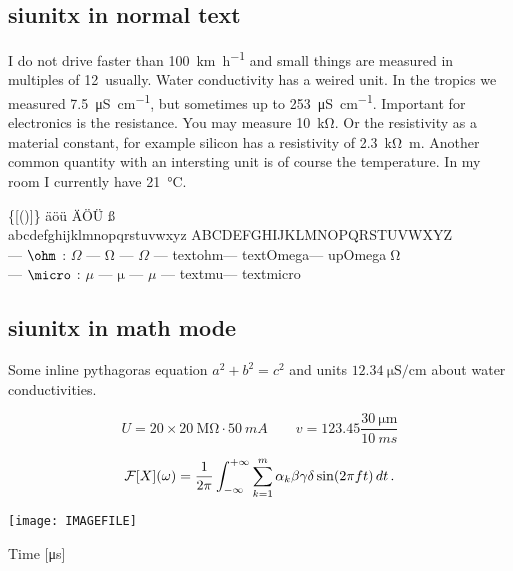 \subsection{siunitx in normal text}

I do not drive faster than \SI{100}{\kilo\meter\per\hour} and small
things are measured in multiples of 12\,\micro\meter{} usually. Water
conductivity has a weired unit. In the tropics we measured
\SI{7.5}{\micro\siemens\per\centi\meter}, but sometimes up to
\SI{253}{\micro\siemens\per\centi\meter}. Important for electronics is the
resistance. You may measure \SI{10}{\kilo\ohm}. Or the resistivity as
a material constant, for example silicon has a resistivity of
\SI{2.3}{\kilo\ohm\meter}. Another common quantity with an intersting
unit is of course the temperature. In my room I currently have
\SI{21}{\degreeCelsius}.

\bigskip
{} \qquad \{[()]\} \qquad \"a\"o\"u  \"A\"O\"U {\ss} \\
abcdefghijklmnopqrstuvwxyz \qquad ABCDEFGHIJKLMNOPQRSTUVWXYZ \\
\ohm{} --- $\ohm$ : $\Omega$ --- $\mathrm{\Omega}$ --- $\mathsf{\Omega}$ ---
\ifcsname textohm\endcsname\textohm\fi  --- \ifcsname textOmega\endcsname\textOmega\fi ---
\ifcsname upOmega\endcsname$\upOmega$\fi \\
\micro{} --- $\micro$ : $\mu$ --- $\mathrm{\mu}$ --- $\mathsf{\mu}$ ---
\ifcsname textmu\endcsname\textmu\fi --- \ifcsname textmicro\endcsname\textmicro\fi

\subsection{siunitx in math mode}

Some inline pythagoras equation $a^2 + b^2 = c^2$ and units
$\SI{12.34}{\micro\siemens\per\centi\meter}$ about water
conductivities.

\[ U = 20 \times \SI{20}{\mega\ohm}\cdot\SI{50}{mA} \qquad
   v = 123.45 \frac{\SI{30}{\micro\meter}}{\SI{10}{ms}} \]

\[ {\cal F}[X](\omega) = \frac{1}{2\pi}\int_{-\infty}^{+\infty} \sum_{k=1}^m \alpha_k\beta\gamma\delta\sin(2\pi f t)\,dt\,. \]

\noindent
\texttt{[image: IMAGEFILE]}
\centerline{Time [\si{\micro\second}]}
